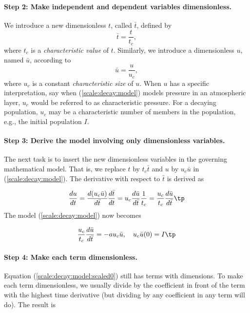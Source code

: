 \documentclass[graybox,envcountchap,sectrefs,final]{svmonodo}
\begin{document}

\paragraph{Step 2: Make independent and dependent variables dimensionless.}
We introduce a new dimensionless $t$, called $\bar t$, defined by
\begin{equation}
\bar t = \frac{t}{t_c},
\end{equation}
where $t_c$ is a \emph{characteristic value} of $t$. Similarly,
we introduce a dimensionless $u$, named $\bar u$, according to
\begin{equation}
\bar u = \frac{u}{u_c},
\end{equation}
where $u_c$ is a constant \emph{characteristic size} of $u$. When $u$ has a specific
interpretation, say when (\ref{scale:decay:model}) models pressure
in an atmospheric layer, $u_c$ would be referred to as characteristic pressure.
For a decaying population, $u_c$ may be a characteristic number of
members in the population, e.g., the initial population $I$.

\paragraph{Step 3: Derive the model involving only dimensionless variables.}
The next task is to insert the new dimensionless variables in the
governing mathematical model. That is, we replace $t$ by $t_c\bar t$
and $u$ by $u_c\bar u$ in (\ref{scale:decay:model}). The derivative
with respect to $\bar t$ is derived as

\[ \frac{du}{dt} = \frac{d (u_c\bar u)}{d\bar t}\frac{d\bar t}{dt}
= u_c\frac{d\bar u}{d\bar t}\frac{1}{t_c} =
\frac{u_c}{t_c}\frac{d\bar u}{d\bar t}\tp
\]
The model (\ref{scale:decay:model}) now becomes

\begin{equation}
\frac{u_c}{t_c}\frac{d\bar u}{d\bar t} = -au_c\bar u,\quad u_c\bar u(0)=I\tp
\label{scale:decay:model:scaled0}
\end{equation}

\paragraph{Step 4: Make each term dimensionless.}
Equation (\ref{scale:decay:model:scaled0}) still has terms with
dimensions. To make each term dimensionless, we usually divide by
the coefficient in front of the term with the highest time derivative
(but dividing by any coefficient in any term will do). The result is
\end{document}
